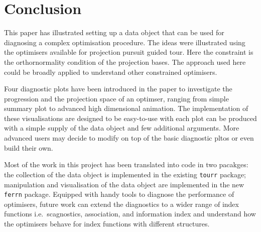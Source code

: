 \documentclass[12pt]{article}
\begin{document}
\hypertarget{conclusion}{%
\section{Conclusion}\label{conclusion}}

This paper has illustrated setting up a data object that can be used for diagnosing a complex optimisation procedure. The ideas were illustrated using the optimisers available for projection pursuit guided tour. Here the constraint is the orthornormality condition of the projection bases. The approach used here could be broadly applied to understand other constrained optimisers.

Four diagnostic plots have been introduced in the paper to investigate the progression and the projection space of an optimser, ranging from simple summary plot to advanced high dimensional animation. The implementation of these visualisations are designed to be easy-to-use with each plot can be produced with a simple supply of the data object and few additional arguments. More advanced users may decide to modify on top of the basic diagnostic pltos or even build their own.

Most of the work in this project has been translated into code in two pacakges: the collection of the data object is implemented in the existing \texttt{tourr} package; manipulation and visualisation of the data object are implemented in the new \texttt{ferrn} package. Equipped with handy tools to diagnose the performance of optimisers, future work can extend the diagnostics to a wider range of index functions i.e.~scagnostics, association, and information index \citep{laa2020using} and understand how the optimisers behave for index functions with different structures.

\clearpage



\end{document}
